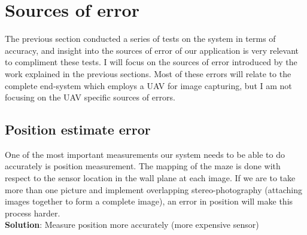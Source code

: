 \section{Sources of error}
\label{soe}
The previous section conducted a series of tests on the system in terms of accuracy, and insight into the sources of error of our application is very relevant to compliment these tests. I will focus on the sources of error introduced by the work explained in the previous sections. Most of these errors will relate to the complete end-system which employs a UAV for image capturing, but I am not focusing on the UAV specific sources of errors.
\subsection{Position estimate error}
One of the most important measurements our system needs to be able to do accurately is position measurement. The mapping of the maze is done with respect to the sensor location in the wall plane at each image. If we are to take more than one picture and implement overlapping stereo-photography (attaching images together to form a complete image), an error in position will make this process harder.\\

\textbf{Solution}: Measure position more accurately (more expensive sensor)

